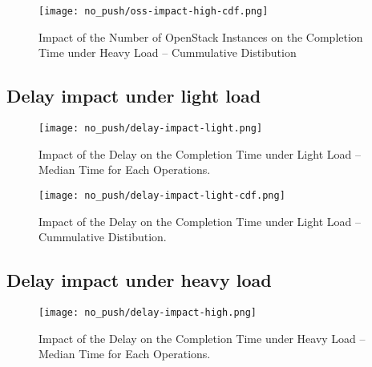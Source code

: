 \begin{figure}[H]
  \vspace{-10pt}
  \centering
  \centerline{\texttt{[image: no\_push/oss-impact-high-cdf.png]}}
  \vspace{-5pt}
  \caption{Impact of the Number of OpenStack Instances on the Completion Time under Heavy Load – Cummulative Distibution}
  \vspace{-5pt}
  \label{fig:oss-impact-high-cdf}
\end{figure}

\subsection{Delay impact under light load}
\begin{figure}[H]
  \vspace{-10pt}
  \centering
  \centerline{\texttt{[image: no\_push/delay-impact-light.png]}}
  \vspace{-5pt}
  \caption{Impact of the Delay on the Completion Time under Light Load – Median Time for Each Operations.}
  \vspace{-5pt}
  \label{fig:delay-impact-light}
\end{figure}

\begin{figure}[H]
  \vspace{-10pt}
  \centering
  \centerline{\texttt{[image: no\_push/delay-impact-light-cdf.png]}}
  \vspace{-5pt}
  \caption{Impact of the Delay on the Completion Time under Light Load – Cummulative Distibution.}
  \vspace{-5pt}
  \label{fig:delay-impact-light-cdf}
\end{figure}

\subsection{Delay impact under heavy load}
\begin{figure}[H]
  \vspace{-10pt}
  \centering
  \centerline{\texttt{[image: no\_push/delay-impact-high.png]}}
  \vspace{-5pt}
  \caption{Impact of the Delay on the Completion Time under Heavy Load – Median Time for Each Operations.}
  \vspace{-5pt}
  \label{fig:delay-impact-high}
\end{figure}

